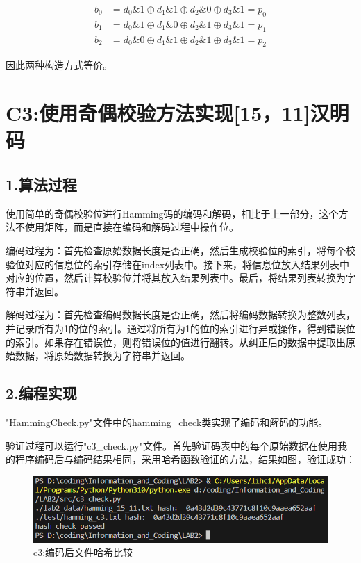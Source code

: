\documentclass[12pt, a4paper]{ctexart}
\begin{document}
    $$
    \begin{aligned}
    b_0 &= d_0 \& 1 \oplus d_1 \& 1 \oplus d_2 \& 0 \oplus d_3 \& 1 = p_0\\
    b_1 &= d_0 \& 1 \oplus d_1 \& 0 \oplus d_2 \& 1 \oplus d_3 \& 1 = p_1\\
    b_2 &= d_0 \& 0 \oplus d_1 \& 1 \oplus d_2 \& 1 \oplus d_3 \& 1 = p_2
    \end{aligned}
    $$

    因此两种构造方式等价。

\section*{C3:使用奇偶校验方法实现[15，11]汉明码}
    \subsection*{1.算法过程}
    使用简单的奇偶校验位进行Hamming码的编码和解码，相比于上一部分，这个方法不使用矩阵，而是直接在编码和解码过程中操作位。

    编码过程为：首先检查原始数据长度是否正确，然后生成校验位的索引，将每个校验位对应的信息位的索引存储在index列表中。接下来，将信息位放入结果列表中对应的位置，然后计算校验位并将其放入结果列表中。最后，将结果列表转换为字符串并返回。

    解码过程为：首先检查编码数据长度是否正确，然后将编码数据转换为整数列表，并记录所有为1的位的索引。通过将所有为1的位的索引进行异或操作，得到错误位的索引。如果存在错误位，则将错误位的值进行翻转。从纠正后的数据中提取出原始数据，将原始数据转换为字符串并返回。

    \subsection*{2.编程实现}
    "HammingCheck.py"文件中的hamming\_check类实现了编码和解码的功能。

    验证过程可以运行"c3\_check.py"文件。首先验证码表中的每个原始数据在使用我的程序编码后与编码结果相同，采用哈希函数验证的方法，结果如图，验证成功：
    \begin{figure}[H]
        \centering
        \includegraphics[width=12cm]{./pic/2-1.png}		
        \caption{c3:编码后文件哈希比较}
    \end{figure}
\end{document}
